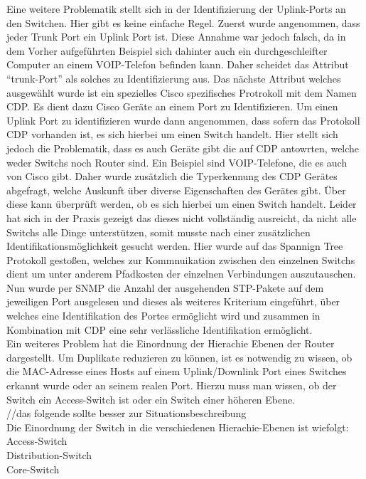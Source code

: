 Eine weitere Problematik stellt sich in der Identifizierung der Uplink-Ports an den Switchen. Hier gibt es keine einfache Regel. Zuerst wurde angenommen, dass jeder Trunk Port ein Uplink Port ist. Diese Annahme war jedoch falsch, da in dem Vorher aufgeführten Beispiel sich dahinter auch ein durchgeschleifter Computer an einem VOIP-Telefon befinden kann. Daher scheidet das Attribut “trunk-Port” als solches zu Identifizierung aus. Das nächste Attribut welches ausgewählt wurde ist ein spezielles Cisco spezifisches Protrokoll mit dem Namen CDP. Es dient dazu Cisco Geräte an einem Port zu Identifizieren. Um einen Uplink Port zu identifizieren wurde dann angenommen, dass sofern das Protokoll CDP vorhanden ist, es sich hierbei um einen Switch handelt. Hier stellt sich jedoch die Problematik, dass es auch Geräte gibt die auf CDP antowrten, welche weder Switchs noch Router sind. Ein Beispiel sind VOIP-Telefone, die es auch von Cisco gibt. Daher wurde zusätzlich die Typerkennung des CDP Gerätes abgefragt, welche Auskunft über diverse Eigenschaften des Gerätes gibt. Über diese kann überprüft werden, ob es sich hierbei um einen Switch handelt. Leider hat sich in der Praxis gezeigt das dieses nicht vollständig ausreicht, da nicht alle Switchs alle Dinge unterstützen, somit musste nach einer zusätzlichen Identifikationsmöglichkeit gesucht werden. Hier wurde auf das Spannign Tree Protokoll gestoßen, welches zur Kommnuikation zwischen den einzelnen Switchs dient um unter anderem Pfadkosten der einzelnen Verbindungen auszutauschen. Nun wurde per SNMP die Anzahl der ausgehenden STP-Pakete auf dem jeweiligen Port ausgelesen und dieses als weiteres Kriterium eingeführt, über welches eine Identifikation des Portes ermöglicht wird und zusammen in Kombination mit CDP eine sehr verlässliche Identifikation ermöglicht.\\
Ein weiteres Problem hat die Einordnung der Hierachie Ebenen der Router dargestellt. Um Duplikate reduzieren zu können, ist es notwendig zu wissen, ob die MAC-Adresse eines Hosts auf einem Uplink/Downlink Port eines Switches erkannt wurde oder an seinem realen Port. Hierzu muss man wissen, ob der Switch ein Access-Switch ist oder ein Switch einer höheren Ebene.\\
//das folgende sollte besser zur Situationsbeschreibung\\
Die Einordnung der Switch in die verschiedenen Hierachie-Ebenen ist wiefolgt:\\
Access-Switch\\
Distribution-Switch\\
Core-Switch\\

